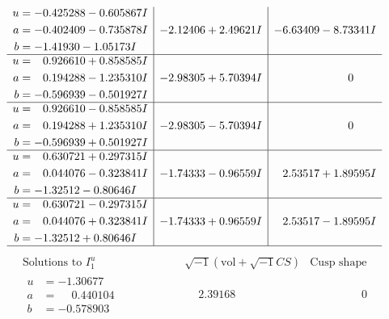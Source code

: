 \documentclass[1p]{elsarticle_modified}
\theoremstyle{definition}
\newcommand{\I}{\sqrt{-1}}
\begin{document}
$$\begin{array}{c|c|c}
\begin{aligned}
u &= -0.425288 - 0.605867 I \\
a &= -0.402409 - 0.735878 I \\
b &= -1.41930 - 1.05173 I\end{aligned}
 & -2.12406 + 2.49621 I & -6.63409 - 8.73341 I \\ \hline\begin{aligned}
u &= \phantom{-}0.926610 + 0.858585 I \\
a &= \phantom{-}0.194288 - 1.235310 I \\
b &= -0.596939 - 0.501927 I\end{aligned}
 & -2.98305 + 5.70394 I & \phantom{-0.000000 } 0 \\ \hline\begin{aligned}
u &= \phantom{-}0.926610 - 0.858585 I \\
a &= \phantom{-}0.194288 + 1.235310 I \\
b &= -0.596939 + 0.501927 I\end{aligned}
 & -2.98305 - 5.70394 I & \phantom{-0.000000 } 0 \\ \hline\begin{aligned}
u &= \phantom{-}0.630721 + 0.297315 I \\
a &= \phantom{-}0.044076 - 0.323841 I \\
b &= -1.32512 - 0.80646 I\end{aligned}
 & -1.74333 - 0.96559 I & \phantom{-}2.53517 + 1.89595 I \\ \hline\begin{aligned}
u &= \phantom{-}0.630721 - 0.297315 I \\
a &= \phantom{-}0.044076 + 0.323841 I \\
b &= -1.32512 + 0.80646 I\end{aligned}
 & -1.74333 + 0.96559 I & \phantom{-}2.53517 - 1.89595 I\\
 \hline 
 \end{array}$$\newpage$$\begin{array}{c|c|c}  
\text{Solutions to }I^u_{1}& \I (\text{vol} + \sqrt{-1}CS) & \text{Cusp shape}\\
 \hline 
\begin{aligned}
u &= -1.30677\phantom{ +0.000000I} \\
a &= \phantom{-}0.440104\phantom{ +0.000000I} \\
b &= -0.578903\phantom{ +0.000000I}\end{aligned}
 & \phantom{-}2.39168\phantom{ +0.000000I} & \phantom{-0.000000 } 0 \\ \hline\begin{aligned}

\end{aligned}
\end{array}$$
\end{document}
